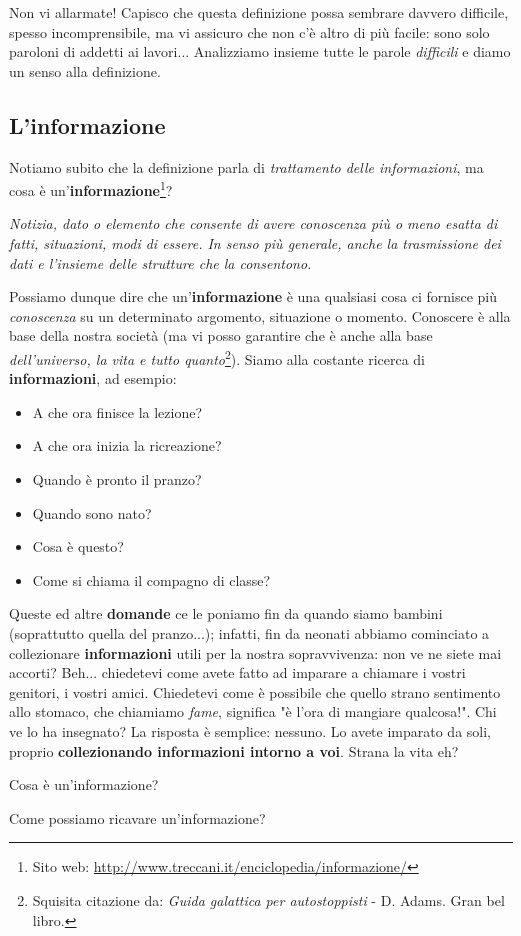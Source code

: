 \documentclass[12pt,fleqn,a4paper]{book} %
\begin{document}
    		Non vi allarmate! Capisco che questa definizione possa sembrare davvero difficile, spesso incomprensibile, ma vi assicuro che non c'è altro di più facile: sono solo paroloni di addetti ai lavori... Analizziamo insieme tutte le parole \textit{difficili} e diamo un senso alla definizione.
    	
    		\subsection{L'informazione}
    		\label{sub: L'informazione}
    			Notiamo subito che la definizione parla di \textit{trattamento delle informazioni}, ma cosa è un'\textbf{informazione}\footnote{Sito web: \url{http://www.treccani.it/enciclopedia/informazione/}}?
    			\begin{definition}[Informazione]\label{def: Informazione}
    				\textit{Notizia, dato o elemento che consente di avere conoscenza più o meno esatta di fatti, situazioni, modi di essere. In senso più generale, anche la trasmissione dei dati e l’insieme delle strutture che la consentono.}
    			\end{definition}
    		
				Possiamo dunque dire che un'\textbf{informazione} è una qualsiasi cosa ci fornisce più \textit{conoscenza} su un determinato argomento, situazione o momento. Conoscere è alla base della nostra società (ma vi posso garantire che è anche  alla base \textit{dell'universo, la vita e tutto quanto}\footnote{Squisita citazione da: \textit{Guida galattica per autostoppisti} - D. Adams. Gran bel libro.}). Siamo alla costante ricerca di \textbf{informazioni}, ad esempio:
    			\begin{itemize}
    				\item A che ora finisce la lezione?
    				\item A che ora inizia la ricreazione?
    				\item Quando è pronto il pranzo?
    				\item Quando sono nato?
    				\item Cosa è questo?
    				\item Come si chiama il compagno di classe?
    			\end{itemize}
    			Queste ed altre \textbf{domande} ce le poniamo fin da quando siamo bambini (soprattutto quella del pranzo...); infatti, fin da neonati abbiamo cominciato a collezionare \textbf{informazioni} utili per la nostra sopravvivenza: non ve ne siete mai accorti? Beh... chiedetevi come avete fatto ad imparare a chiamare i vostri genitori, i vostri amici. Chiedetevi come è possibile che quello strano sentimento allo stomaco, che chiamiamo \textit{fame}, significa "è l'ora di mangiare qualcosa!". Chi ve lo ha insegnato? La risposta è semplice: nessuno. Lo avete imparato da soli, proprio \textbf{collezionando informazioni intorno a voi}. Strana la vita eh?
    			\begin{exercise}
    				Cosa è un'informazione?
    			\end{exercise}    		
    			\begin{exercise}
    				Come possiamo ricavare un'informazione?
    			\end{exercise}
    			
\end{document}
